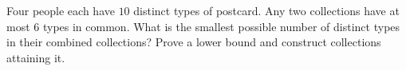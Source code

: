 Four people each have $10$ distinct types of postcard. Any two collections have at most $6$ types in common. What is the smallest possible number of distinct types in their combined collections? Prove a lower bound and construct collections attaining it.
